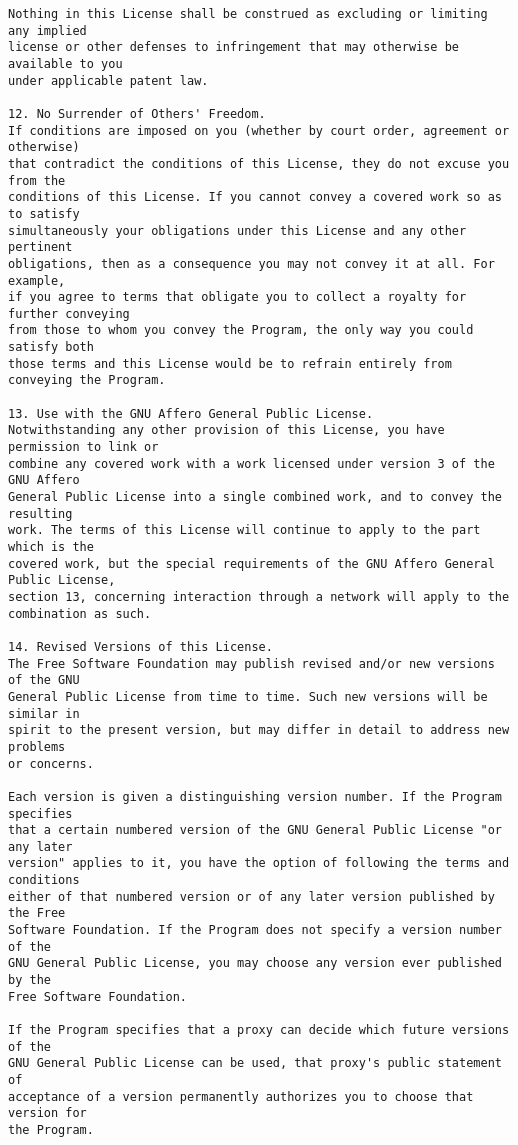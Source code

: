 \begin{verbatim}
Nothing in this License shall be construed as excluding or limiting any implied
license or other defenses to infringement that may otherwise be available to you
under applicable patent law.

12. No Surrender of Others' Freedom.
If conditions are imposed on you (whether by court order, agreement or otherwise)
that contradict the conditions of this License, they do not excuse you from the
conditions of this License. If you cannot convey a covered work so as to satisfy
simultaneously your obligations under this License and any other pertinent
obligations, then as a consequence you may not convey it at all. For example,
if you agree to terms that obligate you to collect a royalty for further conveying
from those to whom you convey the Program, the only way you could satisfy both
those terms and this License would be to refrain entirely from conveying the Program.

13. Use with the GNU Affero General Public License.
Notwithstanding any other provision of this License, you have permission to link or
combine any covered work with a work licensed under version 3 of the GNU Affero
General Public License into a single combined work, and to convey the resulting
work. The terms of this License will continue to apply to the part which is the
covered work, but the special requirements of the GNU Affero General Public License,
section 13, concerning interaction through a network will apply to the
combination as such.

14. Revised Versions of this License.
The Free Software Foundation may publish revised and/or new versions of the GNU
General Public License from time to time. Such new versions will be similar in
spirit to the present version, but may differ in detail to address new problems
or concerns.

Each version is given a distinguishing version number. If the Program specifies
that a certain numbered version of the GNU General Public License "or any later
version" applies to it, you have the option of following the terms and conditions
either of that numbered version or of any later version published by the Free
Software Foundation. If the Program does not specify a version number of the
GNU General Public License, you may choose any version ever published by the
Free Software Foundation.

If the Program specifies that a proxy can decide which future versions of the
GNU General Public License can be used, that proxy's public statement of
acceptance of a version permanently authorizes you to choose that version for
the Program.


\end{verbatim}
